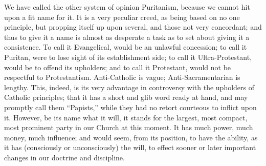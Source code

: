 We have called the other system of opinion
Puritanism, because we cannot hit upon a fit name for it. It is a very
peculiar creed, as being based on no one principle, but propping
itself up upon several, and those not very concordant; and thus to
give it a name is almost as desperate a task as to set about giving it
a consistence. To call it Evangelical, would be an unlawful
concession; to call it Puritan, were to lose sight of its
establishment side; to call it Ultra-Protestant, would be to offend
its upholders; and to call it Protestant, would not be respectful to
Protestantism. Anti-Catholic is vague; Anti-Sacramentarian is lengthy.
This, indeed, is its very advantage in controversy with the upholders
of Catholic principles; that it has a short and glib word ready at
hand, and may promptly call them ``Papists,'' while they had no retort
courteous to inflict upon it. However, be its name what it will, it
stands for the largest, most compact, most prominent party in our
Church at this moment. It has much power, much money, much influence;
and would seem, from its position, to have the ability, as it has
(consciously or unconsciously) the will, to effect sooner or
later important changes in our doctrine and discipline.

